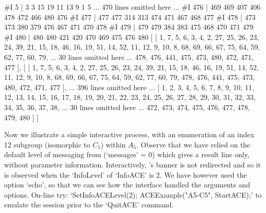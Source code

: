 #I       5 |      3      3     15     19     11     13      9      1      5
... 470 lines omitted here ...
#I     476 |    469    469    407    406    478    472    466    480    476
#I     477 |    477    477    314    313    474    471    467    468    477
#I     478 |    473    473    380    379    476    467    471    470    478
#I     479 |    479    479    384    383    475    468    470    471    479
#I     480 |    480    480    421    420    470    469    475    476    480
[ [ 1, 7, 5, 6, 3, 4, 2, 27, 25, 26, 23, 24, 39, 21, 15, 18, 46, 16, 19, 51, 
      14, 52, 11, 12, 9, 10, 8, 68, 69, 66, 67, 75, 64, 59, 62, 77, 60, 79, 
... 30 lines omitted here ...
      478, 476, 441, 475, 473, 480, 472, 471, 477 ],
[ [ 1, 7, 5, 6, 3, 4, 2, 27, 25, 26, 23, 24, 39, 21, 15, 18, 46, 16, 19, 51, 
      14, 52, 11, 12, 9, 10, 8, 68, 69, 66, 67, 75, 64, 59, 62, 77, 60, 79, 
      478, 476, 441, 475, 473, 480, 472, 471, 477 ], 
... 396 lines omitted here ...
  [ 1, 2, 3, 4, 5, 6, 7, 8, 9, 10, 11, 12, 13, 14, 15, 16, 17, 18, 19, 20, 
      21, 22, 23, 24, 25, 26, 27, 28, 29, 30, 31, 32, 33, 34, 35, 36, 37, 38, 
... 30 lines omitted here ...
      472, 473, 474, 475, 476, 477, 478, 479, 480 ] ]
\endtt


Now we illustrate a simple interactive process, with an enumeration of
an index 12 subgroup (isomorphic to $C_5$) within $A_5$. Observe  that
we  have  relied  on  the  default  level  of  messaging  from  {\ACE}
(`messages' = 0) which gives a result  line  only,  without  parameter
information. Interactively, {\ACE}'s banner is not redirected  and  so
it is observed when the `InfoLevel' of `InfoACE' is 2. We have however
used the option `echo', so that we can see how the  interface  handled
the  arguments  and   options.   On-line   try:   `SetInfoACELevel(2);
ACEExample("A5-C5", StartACE);' to emulate the session  prior  to  the
`QuitACE' command.

